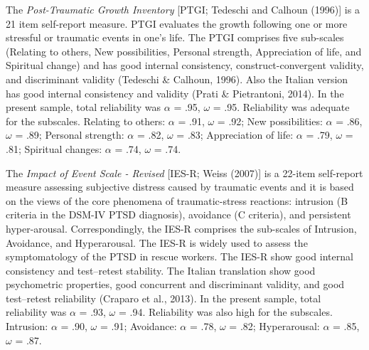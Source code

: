 \documentclass[
  man]{apa7}
\begin{document}
The \emph{Post-Traumatic Growth Inventory} {[}PTGI; Tedeschi and Calhoun (1996){]} is a 21 item self-report measure. PTGI evaluates the growth following one or more stressful or traumatic events in one's life. The PTGI comprises five sub-scales (Relating to others, New possibilities, Personal strength, Appreciation of life, and Spiritual change) and has good internal consistency, construct-convergent validity, and discriminant validity (Tedeschi \& Calhoun, 1996). Also the Italian version has good internal consistency and validity (Prati \& Pietrantoni, 2014). In the present sample, total reliability was \(\alpha\) = .95, \(\omega\) = .95. Reliability was adequate for the subscales. Relating to others: \(\alpha\) = .91, \(\omega\) = .92; New possibilities: \(\alpha\) = .86, \(\omega\) = .89; Personal strength: \(\alpha\) = .82, \(\omega\) = .83; Appreciation of life: \(\alpha\) = .79, \(\omega\) = .81; Spiritual changes: \(\alpha\) = .74, \(\omega\) = .74.

The \emph{Impact of Event Scale - Revised} {[}IES-R; Weiss (2007){]} is a 22-item self-report measure assessing subjective distress caused by traumatic events and it is based on the views of the core phenomena of traumatic-stress reactions: intrusion (B criteria in the DSM-IV PTSD diagnosis), avoidance (C criteria), and persistent hyper-arousal. Correspondingly, the IES-R comprises the sub-scales of Intrusion, Avoidance, and Hyperarousal. The IES-R is widely used to assess the symptomatology of the PTSD in rescue workers. The IES-R show good internal consistency and test--retest stability. The Italian translation show good psychometric properties, good concurrent and discriminant validity, and good test--retest reliability (Craparo et al., 2013). In the present sample, total reliability was \(\alpha\) = .93, \(\omega\) = .94. Reliability was also high for the subscales. Intrusion: \(\alpha\) = .90, \(\omega\) = .91; Avoidance: \(\alpha\) = .78, \(\omega\) = .82; Hyperarousal: \(\alpha\) = .85, \(\omega\) = .87.
\end{document}
